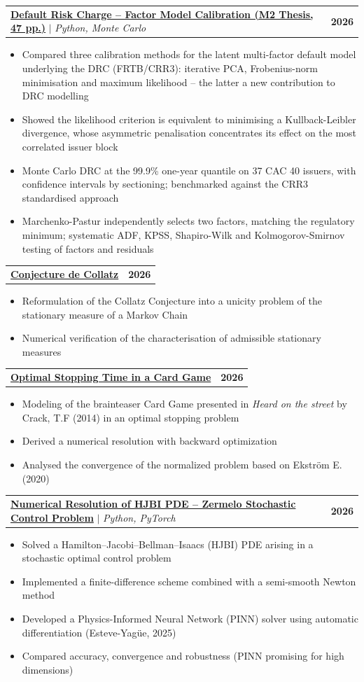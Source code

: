 \documentclass[letterpaper,11pt]{article}
\makeatletter
\newcommand{\resumeItem}[1]{
  \item\small{{#1 \vspace{-2pt}}}
}
\newcommand{\resumeProjectHeading}[2]{
    \item
    \begin{tabular*}{0.97\textwidth}{l@{\extracolsep{\fill}}r}
      \small#1 & \textbf{\small #2}\\
    \end{tabular*}\vspace{-7pt}
}
\newcommand{\resumeItemListStart}{\begin{itemize}}
\newcommand{\resumeItemListEnd}{\end{itemize}\vspace{-5pt}}
\makeatother
\begin{document}
\resumeProjectHeading
    {\href{https://usenamefd.github.io/projects/drc-frtb-cac40.html}{\textbf{Default Risk Charge -- Factor Model Calibration (M2 Thesis, 47 pp.)}} $|$ \emph{Python, Monte Carlo}} {2026}
    \resumeItemListStart
      \resumeItem{Compared three calibration methods for the latent multi-factor default model underlying the DRC (FRTB/CRR3): iterative PCA, Frobenius-norm minimisation and maximum likelihood -- the latter a new contribution to DRC modelling}
      \resumeItem{Showed the likelihood criterion is equivalent to minimising a Kullback-Leibler divergence, whose asymmetric penalisation concentrates its effect on the most correlated issuer block}
      \resumeItem{Monte Carlo DRC at the 99.9\% one-year quantile on 37 CAC 40 issuers, with confidence intervals by sectioning; benchmarked against the CRR3 standardised approach}
      \resumeItem{Marchenko-Pastur independently selects two factors, matching the regulatory minimum; systematic ADF, KPSS, Shapiro-Wilk and Kolmogorov-Smirnov testing of factors and residuals}
    \resumeItemListEnd

\resumeProjectHeading
    {\href{https://github.com/usenameFD/Conjecture-de-Collatz}{\textbf{Conjecture de Collatz}}} {2026}
    \resumeItemListStart
      \resumeItem{Reformulation of the Collatz Conjecture into a unicity problem of the stationary measure of a Markov Chain}
      \resumeItem{Numerical verification of the characterisation of admissible stationary measures}
    \resumeItemListEnd

    \resumeProjectHeading
    {\href{https://github.com/usenameFD/Numerical_methods/blob/main/M\%C3\%A9thode_Num\%C3\%A9rique.pdf}{\textbf{Optimal Stopping Time in a Card Game}}} {2026}
    \resumeItemListStart
      \resumeItem{Modeling of the brainteaser Card Game presented in \textit{Heard on the street} by Crack, T.F (2014) in an optimal stopping problem}
      \resumeItem{Derived a numerical resolution with backward optimization}
      \resumeItem{Analysed the convergence of the normalized problem based on Ekström E. (2020)}
    \resumeItemListEnd
    
  \resumeProjectHeading
    {\href{https://github.com/usenameFD/Numerical_methods/blob/main/zermeloNotebook.ipynb}{\textbf{Numerical Resolution of HJBI PDE – Zermelo Stochastic Control Problem}} $|$ \emph{Python, PyTorch}} {2026}
    \resumeItemListStart
      \resumeItem{Solved a Hamilton–Jacobi–Bellman–Isaacs (HJBI) PDE arising in a stochastic optimal control problem}
      \resumeItem{Implemented a finite-difference scheme combined with a semi-smooth Newton method}
      \resumeItem{Developed a Physics-Informed Neural Network (PINN) solver using automatic differentiation (Esteve-Yagüe, 2025)}
      \resumeItem{Compared accuracy, convergence and robustness (PINN promising for high dimensions)}
    \resumeItemListEnd
\end{document}
